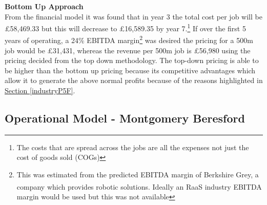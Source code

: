\documentclass[11pt]{article}		%
\newcommand{\supercite}[1]{\textsuperscript{\cite{#1}}}		%
\newcommand{\sectref}[1]{\hyperref[#1]{Section \ref*{#1}}}     %
\begin{document}
            \textbf{Bottom Up Approach}
            \\
            From the financial model it was found that in year 3 the total cost per job will be £58,469.33 but this will decrease to £16,589.35 by year 7.\footnote{The costs that are spread across the jobs are all the expenses not just the cost of goods sold (COGs)} If over the first 5 years of operating, a 24\% EBITDA margin\footnote{This was estimated from the predicted EBITDA margin of Berkshire Grey, a company which provides robotic solutions\supercite{Berkshire}. Ideally an RaaS industry EBITDA margin would be used but this was not available} was desired the pricing for a 500m job would be £31,431, whereas the revenue per 500m job is £56,980 using the pricing decided from the top down methodology. The top-down pricing is able to be higher than the bottom up pricing because its competitive advantages which allow it to generate the above normal profits because of the reasons highlighted in \sectref{industryP5F}.
        
           \subsection[Operational Model]{Operational Model - Montgomery Beresford}
	        
\end{document}
